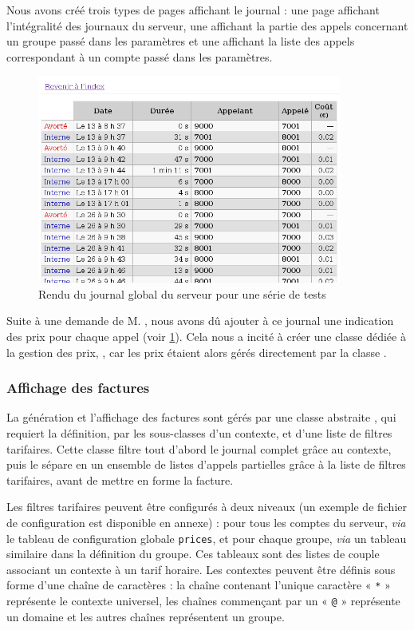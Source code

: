 Nous avons créé trois types de pages affichant le journal : une page affichant l’intégralité des journaux du serveur, une affichant la partie des appels concernant un groupe passé dans les paramètres et une affichant la liste des appels correspondant à un compte passé dans les paramètres.

\begin{figure}[H]
\begin{center}
\includegraphics[width=10cm]{images/journal-global.png}
\end{center}
\label{imgjournal}
\caption{Rendu du journal global du serveur pour une série de tests}
\end{figure}

Suite à une demande de M. , nous avons dû ajouter à ce journal une indication des prix pour chaque appel (voir \cref{imgjournal}). Cela nous a incité à créer une classe dédiée à la gestion des prix, , car les prix étaient alors gérés directement par la classe .

\newpage

\subsubsection{Affichage des factures}

La génération et l’affichage des factures sont gérés par une classe abstraite , qui requiert la définition, par les sous-classes d’un contexte, et d’une liste de filtres tarifaires. Cette classe filtre tout d’abord le journal complet grâce au contexte, puis le sépare en un ensemble de listes d’appels partielles grâce à la liste de filtres tarifaires, avant de mettre en forme la facture.

Les filtres tarifaires peuvent être configurés à deux niveaux (un exemple de fichier de configuration est disponible en annexe) : pour tous les comptes du serveur, \textit{via} le tableau de configuration globale \texttt{prices}, et pour chaque groupe, \textit{via} un tableau similaire dans la définition du groupe. Ces tableaux sont des listes de couple associant un contexte à un tarif horaire. Les contextes peuvent être définis sous forme d’une chaîne de caractères : la chaîne contenant l’unique caractère « \texttt{*} » représente le contexte universel, les chaînes commençant par un « \texttt{@} » représente un domaine et les autres chaînes représentent un groupe.

